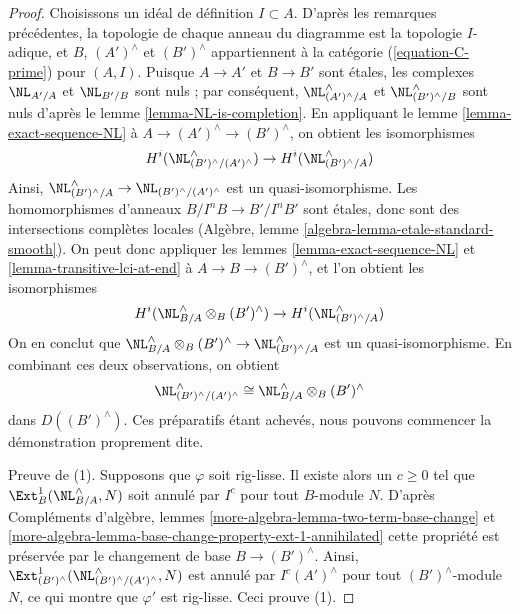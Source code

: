 \begin{proof}
\medskip\noindent
Choisissons un idéal de définition $I \subset A$. D'après les remarques précédentes,
la topologie de chaque anneau du diagramme est la topologie $I$-adique,
et $B$, $(A')^\wedge$ et $(B')^\wedge$ appartiennent à la catégorie
(\ref{equation-C-prime}) pour $(A, I)$.
Puisque $A \to A'$ et $B \to B'$ sont étales, les complexes
$\NL_{A'/A}$ et $\NL_{B'/B}$ sont nuls ; par conséquent,
$\NL_{(A')^\wedge/A}^\wedge$ et $\NL_{(B')^\wedge/B}^\wedge$
sont nuls d'après le lemme \ref{lemma-NL-is-completion}.
En appliquant le lemme \ref{lemma-exact-sequence-NL} à
$A \to (A')^\wedge \to (B')^\wedge$, on obtient les isomorphismes
$$
H^i(\NL_{(B')^\wedge/(A')^\wedge}^\wedge) \to H^i(\NL_{(B')^\wedge/A}^\wedge)
$$
Ainsi, $\NL_{(B')^\wedge/A}^\wedge \to \NL_{(B')^\wedge/(A')^\wedge}$
est un quasi-isomorphisme. Les homomorphismes d'anneaux $B/I^nB \to B'/I^nB'$ sont étales,
donc sont des intersections complètes locales
(Algèbre, lemme \ref{algebra-lemma-etale-standard-smooth}).
On peut donc appliquer les
lemmes \ref{lemma-exact-sequence-NL} et
\ref{lemma-transitive-lci-at-end} à
$A \to B \to (B')^\wedge$, et l'on obtient les isomorphismes
$$
H^i(\NL_{B/A}^\wedge \otimes_B (B')^\wedge) \to
H^i(\NL_{(B')^\wedge/A}^\wedge)
$$
On en conclut que
$\NL_{B/A}^\wedge \otimes_B (B')^\wedge \to \NL_{(B')^\wedge/A}^\wedge$
est un quasi-isomorphisme. En combinant ces deux observations, on obtient
$$
\NL_{(B')^\wedge/(A')^\wedge}^\wedge \cong
\NL_{B/A}^\wedge \otimes_B (B')^\wedge
$$
dans $D((B')^\wedge)$.
Ces préparatifs étant achevés, nous pouvons commencer la démonstration proprement dite.

\medskip\noindent
Preuve de (1). Supposons que $\varphi$ soit rig-lisse. Il existe alors un $c \geq 0$
tel que $\Ext^1_B(\NL_{B/A}^\wedge, N)$ soit annulé par $I^c$
pour tout $B$-module $N$. D'après
Compléments d'algèbre, lemmes \ref{more-algebra-lemma-two-term-base-change} et
\ref{more-algebra-lemma-base-change-property-ext-1-annihilated}
cette propriété est préservée par le changement de base $B \to (B')^\wedge$.
Ainsi, $\Ext^1_{(B')^\wedge}(\NL_{(B')^\wedge/(A')^\wedge}^\wedge, N)$
est annulé par $I^c(A')^\wedge$ pour tout $(B')^\wedge$-module $N$,
ce qui montre que $\varphi'$ est rig-lisse.
Ceci prouve (1).


\end{proof}
